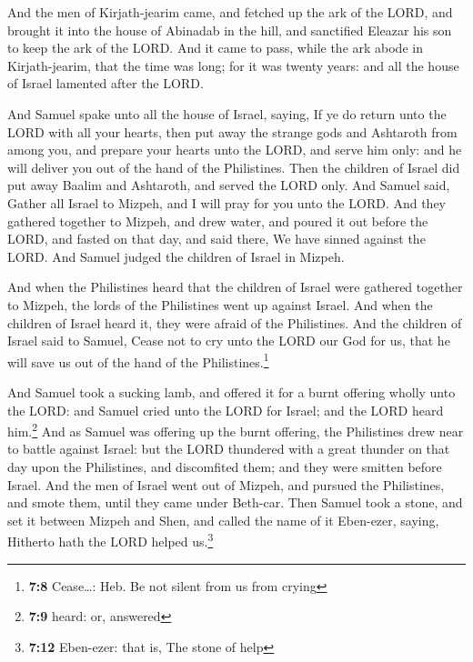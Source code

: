  And the men of Kirjath-jearim came, and fetched up the
ark of the LORD, and brought it into the house of Abinadab in the hill,
and sanctified Eleazar his son to keep the ark of the LORD.
 And it came to pass, while the ark abode in
Kirjath-jearim, that the time was long; for it was twenty years: and all
the house of Israel lamented after the LORD.

 And Samuel spake unto all the house of Israel, saying, If
ye do return unto the LORD with all your hearts, then put away the
strange gods and Ashtaroth from among you, and prepare your hearts unto
the LORD, and serve him only: and he will deliver you out of the hand of
the Philistines.  Then the children of Israel did put away
Baalim and Ashtaroth, and served the LORD only.  And
Samuel said, Gather all Israel to Mizpeh, and I will pray for you unto
the LORD.  And they gathered together to Mizpeh, and drew
water, and poured it out before the LORD, and fasted on that day, and
said there, We have sinned against the LORD. And Samuel judged the
children of Israel in Mizpeh.

 And when the Philistines heard that the children of
Israel were gathered together to Mizpeh, the lords of the Philistines
went up against Israel. And when the children of Israel heard it, they
were afraid of the Philistines.  And the children of
Israel said to Samuel, Cease not to cry unto the LORD our God for us,
that he will save us out of the hand of the Philistines.\footnote{\textbf{7:8}
  Cease\ldots: Heb. Be not silent from us from crying}

 And Samuel took a sucking lamb, and offered it for a
burnt offering wholly unto the LORD: and Samuel cried unto the LORD for
Israel; and the LORD heard him.\footnote{\textbf{7:9} heard: or,
  answered}  And as Samuel was offering up the burnt
offering, the Philistines drew near to battle against Israel: but the
LORD thundered with a great thunder on that day upon the Philistines,
and discomfited them; and they were smitten before Israel.
 And the men of Israel went out of Mizpeh, and pursued
the Philistines, and smote them, until they came under Beth-car.
 Then Samuel took a stone, and set it between Mizpeh and
Shen, and called the name of it Eben-ezer, saying, Hitherto hath the
LORD helped us.\footnote{\textbf{7:12} Eben-ezer: that is, The stone of
  help}

